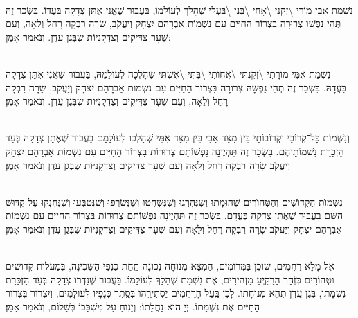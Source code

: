 {\\
נִשְׁמַת אָבִי מוֹרִי \textbackslash זְקֵנִי \textbackslash אָחִי \textbackslash בְּנִי \textbackslash בַּעְלִי  שְׁהָלַךְ לְעוֹלָמוֹ, בַּעֲבוּר שֶׁאֲנִי אֶתֵּן צְדָקָה בַּעֲדוֹ. בִּשְׂכַר זֶה תְּהֵי נַפְשׁוֹ צְרוּרָה בִּצְרוֹר הַחַיִּים עִם נִשְׁמוֹת אַבְרָהַם יִצְחָק וְיַעֲקֹב, שָׂרָה רִבְקָה רָחֵל וְלֵאָה, וְעִם שְׁעָר צַדִּיקִים וְצַדְקָנִיּוֹת שְבְּגַן עֵדֶן. וְנֹאמַר אָמֶן:

\\
נִשְׁמַת אִמִּי מוֹרָתִי \textbackslash זְקֶנְתּי \textbackslash אֲחוׂתִי \textbackslash בִּתִּי \textbackslash אִשְׁתּי
שֶׁהָלְכָה לְעוֹלָמָהּ, בַּעֲבוּר שֶׁאֲנִי אֶתֵּן צְדָקָה בַּעֲדָהּ. בִּשְׂכַר זֶה תְּהֵי נַפְשָׁהּ צְרוּרָה בִּצְרוֹר הַחַיִּים עִם נִשְׁמוֹת אַבְרָהַם יִצְחָק וְיַעֲקֹב, שָׂרָה רִבְקָה רָחֵל וְלֵאָה, וְעִם שְׁעָר צַדִּיקִים וְצַדְקָנִיּוֹת שְבְּגַן עֵדֶן. וְנֹאמַר אָמֶן׃

 \\
וְנִשְׁמוֹת כׇּל־קְרוֹבַי וּקְרוֹבוֹתַי בֵּין מִצַּד אָבִי בֵּין מִצַּד אִמִּי
שְׁהָלְכוּ לְעוׂלָמָם
בַעֲבוּר שֶׁאֶתֵּן צְדָקָה בְּעַד הַזְכָּרַת נִשְׁמוֹתֵיהֶם. בִּשְׂכַר זֶה תִּהְיֶינָה נַפְשׁוֹתָם צְרוּרוֹת בִּצְרוֹר הַחַיִּים עִם נִשְׁמוֹת אַבְרָהַם יִצְחָק וְיַעֲקֹב שָׂרָה רִבְקָה רָחֵל וְלֵאָה וְעִם שְׁעָר צַדִּיקִים וְצַדְקָנִיּוֹת שְבְּגַן עֵדֶן וְנֹאמַר אָמֶן׃



\\
נִשְׁמוׂת הַקְּדוׂשִׁים וְהַטְּהוׂרִים
שֶׁהוּמָתוּ וְשֶנֶּהֶרְגוּ וְשֶׁנִּשְׁחֲטוּ וְשֶׁנִּשְׂרְפוּ וְשֶׁנִּטְבְּעוּ וְשֶׁנֶּחְנְקוּ עַל קִדּוּשׁ הַשֵּם בַעֲבוּר שֶׁאֶתֵּן צְדָקָה בְּעֲדָם. בִּשְׂכַר זֶה תִּהְיֶינָה נַפְשׁוֹתָם צְרוּרוֹת בִּצְרוֹר הַחַיִּים עִם נִשְׁמוֹת אַבְרָהַם יִצְחָק וְיַעֲקֹב שָׂרָה רִבְקָה רָחֵל וְלֵאָה וְעִם שְׁעָר צַדִּיקִים וְצַדְקָנִיּוֹת שְבְּגַן עֵדֶן וְנֹאמַר אָמֶן׃

\\
אֵל מָלֵא רַחֲמִים, שׁוֹכֵן בַּמְּרוֹמִים, הַמְצֵא מְנוּחָה נְכוֹנָה תַּֽחַת כַּנְפֵי הַשְּׁכִינָה, בְּמַעֲלוֹת קְדוֹשִׁים וּטְהוֹרִים כְּזֹֽהַר הָרָקִֽיעַ מַזְהִירִים, אֶת נִשְׁמַת  שֶׁהָלַךְ לְעוֹלָמוֹ. בַּעֲבוּר שֶׁנָּדְרוּ צְדָקָה בְּעַד הַזְכָּרַת נִשְׁמָתוֹ, בְּגַן עֵֽדֶן תְּהֵא מְנוּחָתוֹ. לָכֵן בַּֽעַל הָרַחֲמִים יַסְתִּירֵֽהוּ בְּסֵֽתֶר כְּנָפָיו לְעוֹלָמִים, וְיִצְרוֹר בִּצְרוֹר הַחַיִּים אֶת נִשְׁמָתוֹ. יְיָ הוּא נַחֲלָתוֹ; וְיָנֽוּחַ עַל מִשְׁכָּבוֹ בְּשָׁלוֹם, וְנֹאמַר אָמֵן׃

}
